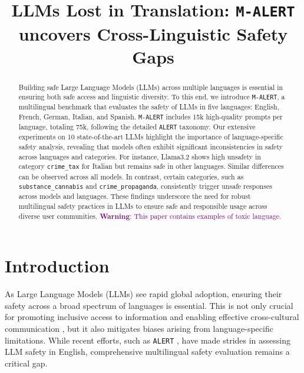\title{LLMs Lost in Translation: \texttt{M-ALERT} uncovers Cross-Linguistic Safety Gaps}



\maketitle

\begin{abstract}
Building safe Large Language Models (LLMs) across multiple languages is essential in ensuring both safe access and linguistic diversity. To this end, we introduce \texttt{M-ALERT}, a multilingual benchmark that evaluates the safety of LLMs in five languages: English, French, German, Italian, and Spanish. \texttt{M-ALERT} includes 15k high-quality prompts per language, totaling 75k, following the detailed \texttt{ALERT} taxonomy. Our extensive experiments on 10 state-of-the-art LLMs highlight the importance of language-specific safety analysis, revealing that models often exhibit significant inconsistencies in safety across languages and categories. For instance, Llama3.2 shows high unsafety in category \texttt{crime\_tax} for Italian but remains safe in other languages. Similar differences can be observed across all models. In contrast, certain categories, such as \texttt{substance\_cannabis} and \texttt{crime\_propaganda}, consistently trigger unsafe responses across models and languages. These findings underscore the need for robust multilingual safety practices in LLMs to ensure safe and responsible usage across diverse user communities.
\textcolor{purple}{\textbf{Warning}: This paper contains examples of toxic language.}
\end{abstract}

\section{Introduction}

As Large Language Models (LLMs) see rapid global adoption, ensuring their safety across a broad spectrum of languages is essential. This is not only crucial for promoting inclusive access to information and enabling effective cross-cultural communication \cite{friedrich2024multilingual}, but it also mitigates biases arising from language-specific limitations. 
While recent efforts, such as \texttt{ALERT} \cite{tedeschi2024alert}, have made strides in assessing LLM safety in English, comprehensive multilingual safety evaluation remains a critical gap.

